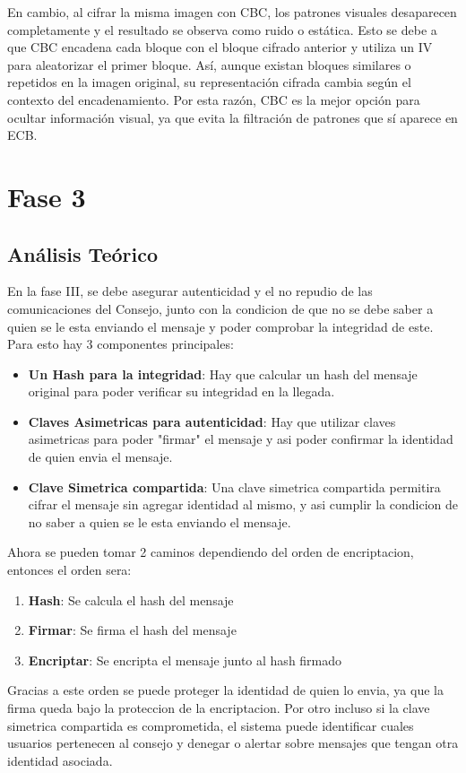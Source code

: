 \documentclass{article}
\begin{document}
En cambio, al cifrar la misma imagen con CBC, los patrones visuales desaparecen completamente y el resultado se observa como ruido o estática. Esto se debe a que CBC encadena cada bloque con el bloque cifrado anterior y utiliza un IV para aleatorizar el primer bloque. Así, aunque existan bloques similares o repetidos en la imagen original, su representación cifrada cambia según el contexto del encadenamiento. Por esta razón, CBC es la mejor opción para ocultar información visual, ya que evita la filtración de patrones que sí aparece en ECB.

\section{Fase 3}

\subsection{Análisis Teórico}
En la fase III, se debe asegurar autenticidad y el no repudio de las comunicaciones del Consejo,
junto con la condicion de que no se debe saber a quien se le esta enviando el mensaje y poder comprobar la integridad de este.
Para esto hay 3 componentes principales:
\begin{itemize}
	\item \textbf{Un Hash para la integridad}: Hay que calcular un hash del mensaje original para poder verificar su integridad en la llegada.
	\item \textbf{Claves Asimetricas para autenticidad}: Hay que utilizar claves asimetricas para poder "firmar" el mensaje y asi poder confirmar la identidad de quien envia el mensaje.
	\item \textbf{Clave Simetrica compartida}: Una clave simetrica compartida permitira cifrar el mensaje sin agregar identidad al mismo, y asi cumplir la condicion de no saber a quien se le esta enviando el mensaje.
\end{itemize}

Ahora se pueden tomar 2 caminos dependiendo del orden de encriptacion, entonces el orden sera:
\begin{enumerate}
	\item \textbf{Hash}: Se calcula el hash del mensaje
	\item \textbf{Firmar}: Se firma el hash del mensaje
	\item \textbf{Encriptar}: Se encripta el mensaje junto al hash firmado
\end{enumerate}
Gracias a este orden se puede proteger la identidad de quien lo envia, ya que la firma queda bajo la proteccion de la encriptacion.
Por otro incluso si la clave simetrica compartida es comprometida, el sistema puede identificar cuales usuarios pertenecen al consejo
y denegar o alertar sobre mensajes que tengan otra identidad asociada.
\end{document}
